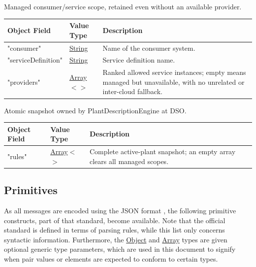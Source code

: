 \documentclass[a4paper]{arrowhead}
\newcommand{\mref}[2][]{{\textcolor{ArrowheadPurple}{\hyperref[sec:model:#2]{\ifstrempty{#1}{#2}{#1}}}}}
\newcommand{\pref}[1]{{\textcolor{ArrowheadGrey}{\hyperref[sec:model:primitives:#1]{#1}}}}
\begin{document}

Managed consumer/service scope, retained even without an available provider.


\noindent\begin{tabularx}{\textwidth}{| >{\raggedright\arraybackslash}p{3.9cm} | >{\raggedright\arraybackslash\small}p{5.3cm} | X |} \hline
\rowcolor{gray!33} Object Field & Value Type & Description \\ \hline
"consumer" & \pref{String} & Name of the consumer system. \\ \hline
"service\allowbreak{}Definition" & \pref{String} & Service definition name. \\ \hline
"providers" & \pref{Array}$<$\allowbreak{}\mref[Orchestration\allowbreak{}Plant\allowbreak{}Provider]{OrchestrationPlantProvider}$>$ & Ranked allowed service instances; empty means managed but unavailable, with no unrelated or inter-cloud fallback. \\ \hline
\end{tabularx}




Atomic snapshot owned by Plant\allowbreak{}Description\allowbreak{}Engine at DSO.


\noindent\begin{tabularx}{\textwidth}{| >{\raggedright\arraybackslash}p{3.9cm} | >{\raggedright\arraybackslash\small}p{5.3cm} | X |} \hline
\rowcolor{gray!33} Object Field & Value Type & Description \\ \hline
"rules" & \pref{Array}$<$\allowbreak{}\mref{OrchestrationPlantRule}$>$ & Complete active-plant snapshot; an empty array clears all managed scopes. \\ \hline
\end{tabularx}



\subsection{Primitives}
\label{sec:model:primitives}

As all messages are encoded using the JSON format \cite{rfc8259}, the following primitive constructs, part of that standard, become available.
Note that the official standard is defined in terms of parsing rules, while this list only concerns syntactic information.
Furthermore, the \pref{Object} and \pref{Array} types are given optional generic type parameters, which are used in this document to signify when pair values or elements are expected to conform to certain types.
\end{document}
